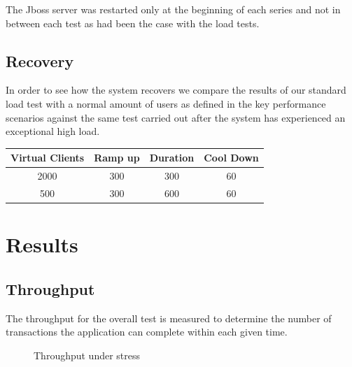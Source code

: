 The Jboss server was restarted only at the beginning of each series and not in between each test as had been the case with the load tests.


\subsection{Recovery}
In order to see how the system recovers we compare the results of our standard load test with a normal amount of users as defined in the key performance scenarios against the same test carried out after the system has experienced an exceptional high load.

\begin{center}
\begin{tabular}{| c | c | c | c |}
\hline
Virtual Clients & Ramp up & Duration & Cool Down \\
\hline 
2000 & 300 & 300 & 60 \\ 
500 & 300 & 600 & 60 \\ 
\hline
\end{tabular}
\end{center}

\section{Results}


\subsection*{Throughput} 
The throughput for the overall test is measured to determine the number of transactions the application can complete within each given time.


\begin{figure}[h]
\centering
{}
\caption{Throughput under stress}
\label{fig:5.1}
\end{figure}

